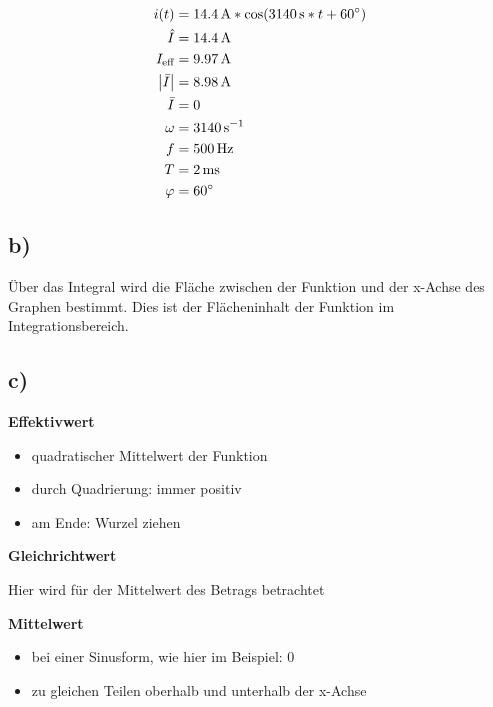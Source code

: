 \documentclass[../../document.tex]{subfiles}
\begin{document}
\begin{equation*}
    \begin{split}
        i(t) &= \SI{14,4}{\ampere} * \cos(\SI{3140}{\second} * t + \SI{60}{\degree})\\
        \hat{I} &= \SI{14,4}{\ampere}\\
        I_{\textrm{eff}} &= \SI{9,97}{\ampere}\\
        \left\lvert\bar{I}\right\rvert &= \SI{8,98}{\ampere}\\
        \bar{I} &= 0\\
        \omega &= \SI{3140}{\second^{-1}}\\
        f &= \SI{500}{\hertz}\\
        T &= \SI{2}{ms}\\
        \varphi &= \SI{60}{\degree}\\
    \end{split}
\end{equation*}

\newpage

\subsection*{b)}

Über das Integral wird die Fläche zwischen der Funktion und der x-Achse des Graphen bestimmt. 
Dies ist der Flächeninhalt der Funktion im Integrationsbereich.

\subsection*{c)}

\textbf{Effektivwert}

\begin{itemize}
    \item quadratischer Mittelwert der Funktion
    \item durch Quadrierung: immer positiv
    \item am Ende: Wurzel ziehen
\end{itemize}

\textbf{Gleichrichtwert}

Hier wird für der Mittelwert des Betrags betrachtet

\textbf{Mittelwert}

\begin{itemize}
    \item bei einer Sinusform, wie hier im Beispiel: 0
    \item zu gleichen Teilen oberhalb und unterhalb der x-Achse
\end{itemize}
\end{document}

